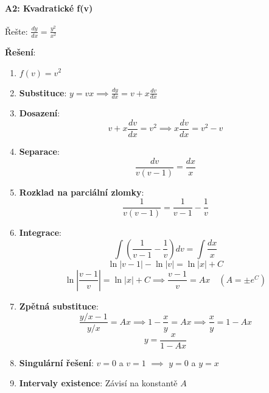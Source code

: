 \vspace{0.8\baselineskip}

\paragraph*{A2: Kvadratické f(v)}

\begin{example}
Řešte: $\frac{dy}{dx} = \frac{y^2}{x^2}$
\vspace{0.3\baselineskip}

\textbf{Řešení}: 
\begin{enumerate}
\item $f(v) = v^2$

\item \textbf{Substituce}: $y = vx \implies \frac{dy}{dx} = v + x\frac{dv}{dx}$

\item \textbf{Dosazení}:
\[
v + x\frac{dv}{dx} = v^2 \implies x\frac{dv}{dx} = v^2 - v
\]

\item \textbf{Separace}:
\[
\frac{dv}{v(v - 1)} = \frac{dx}{x}
\]

\item \textbf{Rozklad na parciální zlomky}:
\[
\frac{1}{v(v - 1)} = \frac{1}{v - 1} - \frac{1}{v}
\]

\item \textbf{Integrace}:
\[
\int \left(\frac{1}{v - 1} - \frac{1}{v}\right)dv = \int \frac{dx}{x}
\]
\[
\ln|v - 1| - \ln|v| = \ln|x| + C
\]
\[
\ln\left|\frac{v - 1}{v}\right| = \ln|x| + C \implies \frac{v - 1}{v} = Ax \quad (A = \pm e^C)
\]

\item \textbf{Zpětná substituce}:
\[
\frac{y/x - 1}{y/x} = Ax \implies 1 - \frac{x}{y} = Ax \implies \frac{x}{y} = 1 - Ax
\]
\[
y = \frac{x}{1 - Ax}
\]

\item \textbf{Singulární řešení}: $v = 0$ a $v = 1$ $\implies$ $y = 0$ a $y = x$

\item \textbf{Intervaly existence}: Závisí na konstantě $A$
\end{enumerate}
\end{example}

\vspace{0.6\baselineskip}


